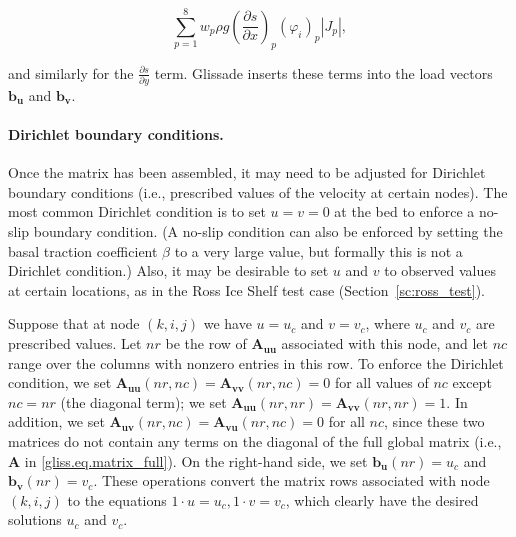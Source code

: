 {\begin{equation}
  \label{gliss.eq.sum_over_qp_gravity}
  \sum\limits_{p=1}^{8} { w_p \rho g \left(\frac{\partial s}{\partial x}\right)_p (\varphi_i)_p |J_p|},
\end{equation}

\noindent
and similarly for the $\frac{\partial s}{\partial y}$ term.
Glissade inserts these terms into the load vectors $\mathbf{b_u}$ and $\mathbf{b_v}$.

\paragraph{Dirichlet boundary conditions.}

Once the matrix has been assembled, it may need to be adjusted for Dirichlet boundary conditions
(i.e., prescribed values of the velocity at certain nodes). The most common Dirichlet condition
is to set $u = v = 0$ at the bed to enforce a no-slip boundary condition.  (A no-slip condition
can also be enforced by setting the basal traction coefficient $\beta$
to a very large value, but formally this is not a Dirichlet condition.)  Also, it may be desirable to
set $u$ and $v$ to observed values at certain locations, as in the Ross Ice Shelf test case
(Section~\ref{sc:ross_test}).

Suppose that at node $(k,i,j)$ we have $u = u_c$ and $v = v_c$, where $u_c$ and $v_c$ are prescribed values.  
Let $nr$ be the row of $\mathbf{A_{uu}}$ associated with this node, and let $nc$ range over the
columns with nonzero entries in this row.
To enforce the Dirichlet condition, we set $\mathbf{A_{uu}}(nr,nc) = \mathbf{A_{vv}}(nr,nc) = 0$ for all
values of $nc$ except $nc = nr$ (the diagonal term); we set $\mathbf{A_{uu}}(nr,nr) = \mathbf{A_{vv}}(nr,nr) = 1$.
In addition, we set $\mathbf{A_{uv}}(nr,nc) = \mathbf{A_{vu}}(nr,nc) = 0$ for all $nc$, since these two matrices do not contain
any terms on the diagonal of the full global matrix (i.e., $\mathbf{A}$ in \eqref{gliss.eq.matrix_full}).
On the right-hand side, we set $\mathbf{b_u}(nr) = u_c$ and $\mathbf{b_v}(nr) = v_c$.  These operations
convert the matrix rows associated with node $(k,i,j)$ to the equations $1 \cdot u = u_c, 1 \cdot v = v_c$,
which clearly have the desired solutions $u_c$ and $v_c$.

}
